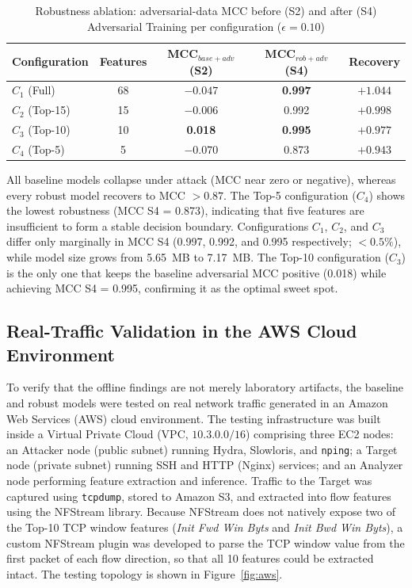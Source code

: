 \documentclass[11pt, a4paper]{article}
\begin{document}
\begin{table}[H]
\caption{Robustness ablation: adversarial-data MCC before (S2) and after (S4) Adversarial Training per configuration ($\epsilon = 0.10$)}
\label{tab:robustness_ablation}
\centering
\small
\begin{tabular}{@{} l c c c c @{}}
\toprule
\textbf{Configuration} & \textbf{Features} & \textbf{MCC$_{base+adv}$ (S2)} & \textbf{MCC$_{rob+adv}$ (S4)} & \textbf{Recovery} \\ \midrule
$C_1$ (Full)   & 68 & $-0.047$ & \textbf{0.997} & $+1.044$ \\
$C_2$ (Top-15) & 15 & $-0.006$ & 0.992 & $+0.998$ \\
$C_3$ (Top-10) & 10 & \textbf{0.018} & \textbf{0.995} & $+0.977$ \\
$C_4$ (Top-5)  & 5  & $-0.070$ & 0.873 & $+0.943$ \\ \bottomrule
\end{tabular}
\end{table}

All baseline models collapse under attack (MCC near zero or negative), whereas every robust model recovers to MCC $> 0.87$. The Top-5 configuration ($C_4$) shows the lowest robustness (MCC S4 = 0.873), indicating that five features are insufficient to form a stable decision boundary. Configurations $C_1$, $C_2$, and $C_3$ differ only marginally in MCC S4 (0.997, 0.992, and 0.995 respectively; $< 0.5\%$), while model size grows from 5.65~MB to 7.17~MB. The Top-10 configuration ($C_3$) is the only one that keeps the baseline adversarial MCC positive (0.018) while achieving MCC S4 = 0.995, confirming it as the optimal sweet spot.

\subsection{Real-Traffic Validation in the AWS Cloud Environment}
To verify that the offline findings are not merely laboratory artifacts, the baseline and robust models were tested on real network traffic generated in an Amazon Web Services (AWS) cloud environment. The testing infrastructure was built inside a Virtual Private Cloud (VPC, $10.3.0.0/16$) comprising three EC2 nodes: an Attacker node (public subnet) running Hydra, Slowloris, and \texttt{nping}; a Target node (private subnet) running SSH and HTTP (Nginx) services; and an Analyzer node performing feature extraction and inference. Traffic to the Target was captured using \texttt{tcpdump}, stored to Amazon S3, and extracted into flow features using the NFStream library. Because NFStream does not natively expose two of the Top-10 TCP window features (\textit{Init Fwd Win Byts} and \textit{Init Bwd Win Byts}), a custom NFStream plugin was developed to parse the TCP window value from the first packet of each flow direction, so that all 10 features could be extracted intact. The testing topology is shown in Figure~\ref{fig:aws}.
\end{document}
